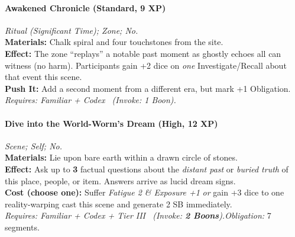 \paragraph{Awakened Chronicle (Standard, 9 XP)} \emph{Ritual (Significant Time); Zone; No.}\\
\textbf{Materials:} Chalk spiral and four touchstones from the site.\\
\textbf{Effect:} The zone ``replays'' a notable past moment as ghostly echoes all can witness (no harm). Participants gain +2 dice on \emph{one} Investigate/Recall about that event this scene.\\
\textbf{Push It:} Add a second moment from a different era, but mark +1 Obligation.\\
\emph{Requires: Familiar + Codex \ (\textit{Invoke:} 1 Boon).}

\paragraph{Dive into the World-Worm's Dream (High, 12 XP)} \emph{Scene; Self; No.}\\
\textbf{Materials:} Lie upon bare earth within a drawn circle of stones.\\
\textbf{Effect:} Ask up to \textbf{3} factual questions about the \emph{distant past} or \emph{buried truth} of this place, people, or item. Answers arrive as lucid dream signs.\\
\textbf{Cost (choose one):} Suffer \emph{Fatigue 2 \& Exposure +1} \emph{or} gain +3 dice to one reality-warping cast this scene and generate 2 SB immediately.\\
\emph{Requires: Familiar + Codex + Tier III \ (\textit{Invoke:} \textbf{2 Boons}).}\quad \emph{Obligation:} 7 segments.
